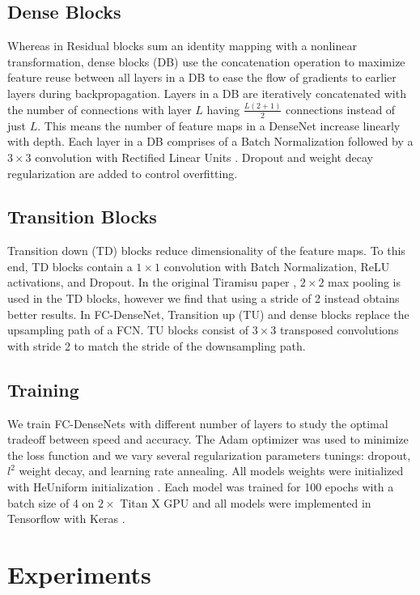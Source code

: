 \documentclass{llncs}
\begin{document}
\subsection{Dense Blocks}
Whereas in Residual blocks \cite{ResNet} sum an identity mapping with a nonlinear transformation, dense blocks (DB) use the concatenation operation to maximize feature reuse between all layers in a DB to ease the flow of gradients to earlier layers during backpropagation. Layers in a DB are iteratively concatenated with the number of connections with layer $L$ having  $\frac{L\left(2+1\right)}{2}$ connections instead of just $L$. This means the number of feature maps in a DenseNet increase linearly with depth. Each layer in a DB comprises of a Batch Normalization \cite{Batchnorm} followed by a $3 \times 3$ convolution with Rectified Linear Units \cite{ReLU}. Dropout \cite{Dropout} and weight decay regularization are added to control overfitting.  

\subsection{Transition Blocks}
Transition down (TD) blocks reduce dimensionality of the feature maps. To this end, TD blocks contain a $ 1 \times 1$ convolution with Batch Normalization, ReLU activations, and Dropout. In the original Tiramisu paper \cite{Tiramisu}, $2 \times 2$ max pooling is used in the TD blocks, however we find that using a stride of 2 instead obtains better results. In FC-DenseNet, Transition up (TU) and dense blocks replace the upsampling path of a FCN. TU blocks consist of $3 \times 3$ transposed convolutions with stride 2 to match the stride of the downsampling path.   

\subsection{Training}
We train FC-DenseNets with different number of layers to study the optimal tradeoff between speed and accuracy. The Adam \cite{Adam} optimizer was used to minimize the loss function and we vary several regularization parameters tunings: dropout, $l^2$ weight decay, and learning rate annealing. All models weights were initialized with HeUniform initialization \cite {ReLU}. Each model was trained for 100 epochs with a batch size of 4 on $2  \times$ Titan X GPU and all models were implemented in Tensorflow with Keras \cite{TensorFlow,Keras}.


\section{Experiments}
\end{document}
